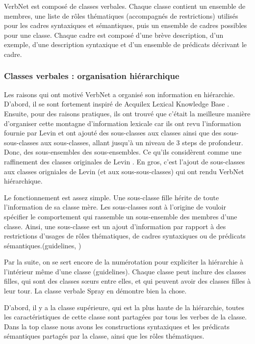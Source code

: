 VerbNet est composé de classes verbales. Chaque classe contient un ensemble de membres, une liste de rôles thématiques (accompagnés de restrictions) utilisés pour les cadres syntaxiques et sémantiques, puis un ensemble de cadres possibles pour une classe. Chaque cadre est composé d'une brève description, d'un exemple, d'une description syntaxique et d'un ensemble de prédicats décrivant le cadre\citep{SchulerVerbnetBroadcoverageComprehensive2005}.

\subsubsection{Classes verbales : organisation hiérarchique}

Les raisons qui ont motivé VerbNet a organisé son information en hiérarchie. D'abord, il se sont fortement inspiré de Acquilex Lexical Knowledge Base \citep{CopestakeACQUILEXLKBrepresentation1992}. Ensuite, pour des raisons pratiques, ils ont trouvé que c'était la meilleure manière d'organiser cette montagne d'information lexicale car ils ont revu l'information fournie par Levin et ont ajouté des sous-classes aux classes ainsi que des sous-sous-classes aux sous-classes, allant jusqu'à un niveau de 3 steps de profondeur. Donc, des sous-ensembles des sous-ensembles. Ce qu'ils considèrent comme une raffinement des classes originales de Levin \citep{SchulerVerbnetBroadcoverageComprehensive2005}. En gros, c'est l'ajout de sous-classes aux classes origniales de Levin (et aux sous-sous-classes) qui ont rendu VerbNet hiérarchique. 

Le fonctionnement est assez simple. Une sous-classe fille hérite de toute l'information de sa classe mère. Les sous-classes sont à l'origine de vouloir spécifier le comportement qui rassemble un sous-ensemble des membres d'une classe. Ainsi, une sous-classe est un ajout d'information par rapport à des restrictions d'usages de rôles thématiques, de cadres syntaxiques ou de prédicats sémantiques.(guidelines, \citep{SchulerVerbnetBroadcoverageComprehensive2005})

Par la suite, on se sert encore de la numérotation pour expliciter la hiérarchie à l'intérieur même d'une classe (guidelines). Chaque classe peut inclure des classes filles, qui sont des classes sœurs entre elles, et qui peuvent avoir des classes filles à leur tour. La classe verbale Spray en démontre bien la chose. 

D'abord, il y a la classe supérieure, qui est la plus haute de la hiérarchie, toutes les caractéristiques de cette classe sont partagées par tous les verbes de la classe. Dans la top classe nous avons les constructions syntaxiques et les prédicats sémantiques partagés par la classe, ainsi que les rôles thématiques. 

